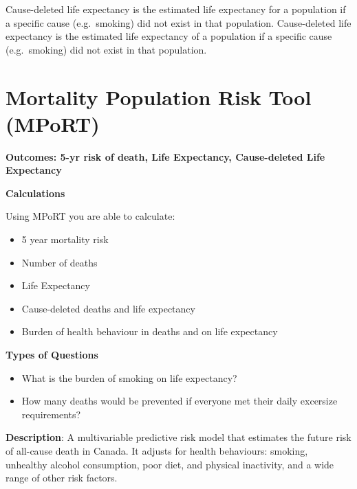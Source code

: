 \documentclass[]{book}
\providecommand{\tightlist}{%
  \setlength{\itemsep}{0pt}\setlength{\parskip}{0pt}}
\begin{document}
Cause-deleted life expectancy is the estimated life
expectancy for a population if a specific cause (e.g.~smoking) did not
exist in that population. Cause-deleted life expectancy is the estimated life
expectancy of a population if a specific cause (e.g.~smoking) did not
exist in that population.

























\appendix


\chapter{Mortality Population Risk Tool
(MPoRT)}\label{mortality-population-risk-tool-mport}

\textbf{Outcomes: 5-yr risk of death, Life Expectancy, Cause-deleted
Life Expectancy}

\textbf{Calculations}

Using MPoRT you are able to calculate:

\begin{itemize}
\tightlist
\item
  5 year mortality risk
\item
  Number of deaths
\item
  Life Expectancy
\item
  Cause-deleted deaths and life expectancy
\item
  Burden of health behaviour in deaths and on life expectancy
\end{itemize}

\textbf{Types of Questions}

\begin{itemize}
\tightlist
\item
  What is the burden of smoking on life expectancy?
\item
  How many deaths would be prevented if everyone met their daily
  excersize requirements?
\end{itemize}

\textbf{Description}: A multivariable predictive risk model that
estimates the future risk of all-cause death in Canada. It adjusts for
health behaviours: smoking, unhealthy alcohol consumption, poor diet,
and physical inactivity, and a wide range of other risk factors.
\end{document}
